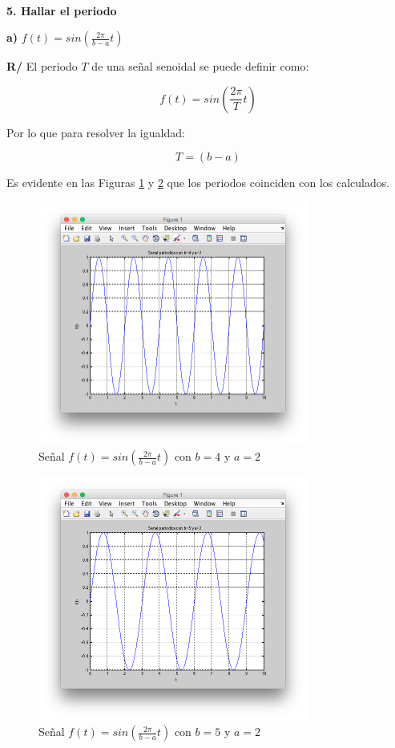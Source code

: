 \documentclass[a4paper]{article}
\begin{document}
$\,$

\textbf{5. Hallar el periodo}

\textbf{a)} $f(t) = sin(\frac{2\pi}{b-a}t)$

\textbf{R/} El periodo $T$ de una señal senoidal se puede definir como:

$$f(t) = sin\left(\frac{2\pi}{T}t\right)$$

Por lo que para resolver la igualdad:

$$T = (b - a)$$

Es evidente en las Figuras \ref{fig_ba4_2} y \ref{fig_ba5_2} que los periodos coinciden con los calculados.

\begin{figure}[!t]
\centering
\includegraphics[width=3.5in]{imgs/ba4_2.png}
\caption{Señal $f(t) = sin(\frac{2\pi}{b-a}t)$ con $b=4$ y $a=2$}
\label{fig_ba4_2}
\end{figure}

\begin{figure}[!t]
\centering
\includegraphics[width=3.5in]{imgs/ba5_2.png}
\caption{Señal $f(t) = sin(\frac{2\pi}{b-a}t)$ con $b=5$ y $a=2$}
\label{fig_ba5_2}
\end{figure}
\end{document}
